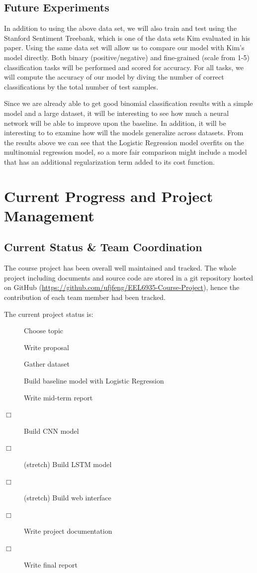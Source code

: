 \documentclass[conference]{IEEEtran}
\begin{document}
\subsection{Future Experiments}
    In addition to using the above data set, we will also train and test using the 
    Stanford Sentiment Treebank, which is one of the data sets Kim evaluated in 
    his paper\cite{sentimenttreebank}. Using the same data set
    will allow us to compare our model with Kim's model directly. 
    Both binary (positive/negative) and fine-grained (scale from 1-5) 
    classification tasks will be performed and scored for accuracy.
    For all tasks, we will compute the accuracy of our model by diving the 
    number of correct classifications by the total number of test samples.
    
    Since we are already able to get good binomial classification results with a simple
    model and a large dataset, it will be interesting to see how much a neural network
    will be able to improve upon the baseline. In addition, it will be interesting to
    to examine how will the models generalize across datasets. From the results
    above we can see that the Logistic Regression model overfits on the multinomial
    regression model, so a more fair comparison might include a model that has
    an additional regularization term added to its cost function.
    
\section{Current Progress and Project Management}
\label{manage}

\subsection{Current Status \& Team Coordination}
\label{manage:status}
    The course project has been overall well maintained and tracked. 
    The whole project including documents and source code are stored
    in a git repository hosted on GitHub 
    (\url{https://github.com/ufjfeng/EEL6935-Course-Project}),
    hence the contribution of each team member had been tracked.
    
    The current project status is:
    \begin{description}
        \item[\CheckedBox] Choose topic
        \item[\CheckedBox] Write proposal
        \item[\CheckedBox] Gather dataset
        \item[\CheckedBox] Build baseline model with Logistic Regression
        \item[\CheckedBox] Write mid-term report 
        \item[$\Box$] Build CNN model
        \item[$\Box$] (stretch) Build LSTM model
        \item[$\Box$] (stretch) Build web interface
        \item[$\Box$] Write project documentation
        \item[$\Box$] Write final report
    \end{description}
\end{document}
